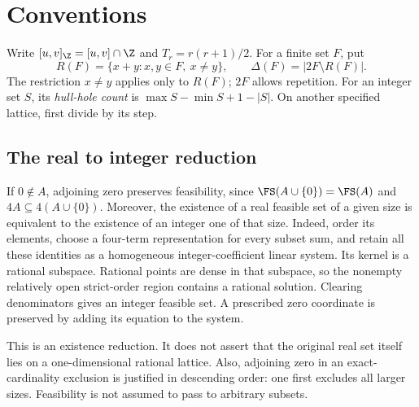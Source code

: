 
\section{Conventions}
Write $[u,v]_{\Z}=[u,v]\cap\Z$ and $T_r=r(r+1)/2$. For a finite set $F$, put
\[
 R(F)=\{x+y:x,y\in F,\ x\ne y\},\qquad
 \Delta(F)=|2F\setminus R(F)|.
\]
The restriction $x\ne y$ applies only to $R(F)$; $2F$ allows repetition.
For an integer set $S$, its \emph{hull-hole count} is
$\max S-\min S+1-|S|$. On another specified lattice, first divide by its
step.

\subsection{The real to integer reduction}
If $0\notin A$, adjoining zero preserves feasibility, since
$\FS(A\cup\{0\})=\FS(A)$ and $4A\subseteq4(A\cup\{0\})$.
Moreover, the existence of a real feasible set of a given size is equivalent
to the existence of an integer one of that size. Indeed, order its elements,
choose a four-term representation for every subset sum, and retain all
these identities as a homogeneous integer-coefficient linear system. Its
kernel is a rational subspace. Rational points are dense in that subspace,
so the nonempty relatively open strict-order region contains a rational
solution. Clearing denominators gives an integer feasible set. A prescribed
zero coordinate is preserved by adding its equation to the system.

This is an existence reduction. It does not assert that the original real
set itself lies on a one-dimensional rational lattice. Also, adjoining
zero in an exact-cardinality exclusion is justified in descending order:
one first excludes all larger sizes. Feasibility is not assumed to pass to
arbitrary subsets.


